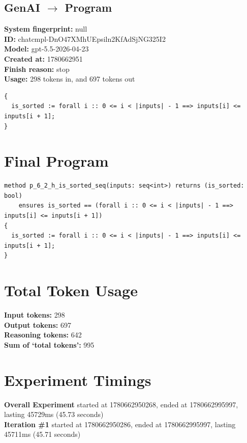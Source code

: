 \documentclass{article}
\begin{document}
\subsection*{GenAI $\rightarrow$ Program}
\textbf{System fingerprint: }null
\\\textbf{ID: }chatcmpl-DnO47XMhUEpsiln2KfAdSjNG325I2
\\\textbf{Model: }gpt-5.5-2026-04-23
\\\textbf{Created at: }1780662951
\\\textbf{Finish reason: }stop
\\\textbf{Usage: }298 tokens in, and 697 tokens out
\begin{lstlisting}
{
  is_sorted := forall i :: 0 <= i < |inputs| - 1 ==> inputs[i] <= inputs[i + 1];
}
\end{lstlisting}
\section*{Final Program}
\begin{lstlisting}
method p_6_2_h_is_sorted_seq(inputs: seq<int>) returns (is_sorted: bool)
	ensures is_sorted == (forall i :: 0 <= i < |inputs| - 1 ==> inputs[i] <= inputs[i + 1])
{
  is_sorted := forall i :: 0 <= i < |inputs| - 1 ==> inputs[i] <= inputs[i + 1];
}
\end{lstlisting}
\section*{Total Token Usage}
\textbf{Input tokens: }298
\\\textbf{Output tokens: }697
\\\textbf{Reasoning tokens: }642
\\\textbf{Sum of `total tokens': }995
\section*{Experiment Timings}
\textbf{Overall Experiment} started at 1780662950268, ended at 1780662995997, lasting 45729ms (45.73 seconds)
\\\textbf{Iteration \#1} started at 1780662950286, ended at 1780662995997, lasting 45711ms (45.71 seconds)
\end{document}
